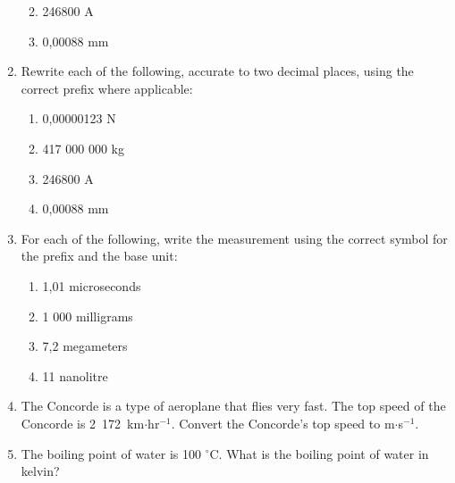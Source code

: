 \begin{enumerate}[noitemsep, label=\textbf{\arabic*}. ]
\begin{enumerate}[noitemsep, label=\textbf{\alph*}. ]
\label{m30853*uid81}\item 246800 A
\label{m30853*uid82}\item 0,00088 mm
\end{enumerate}
                \label{m30853*uid83}\item Rewrite each of the following, accurate to two decimal places, using the correct prefix where applicable:
\label{m30853*id68367}\begin{enumerate}[noitemsep, label=\textbf{\alph*}. ] 
            \label{m30853*uid84}\item 0,00000123 N
\label{m30853*uid85}\item 417 000 000 kg
\label{m30853*uid86}\item 246800 A
\label{m30853*uid87}\item 0,00088 mm
\end{enumerate}
                \label{m30853*uid88}\item For each of the following, write the measurement using the correct symbol for the prefix and the base unit:
\label{m30853*id68433}\begin{enumerate}[noitemsep, label=\textbf{\alph*}. ] 
            \label{m30853*uid89}\item 1,01 microseconds
\label{m30853*uid90}\item 1 000 milligrams
\label{m30853*uid91}\item 7,2 megameters
\label{m30853*uid92}\item 11 nanolitre
\end{enumerate}
                \label{m30853*uid93}\item The Concorde is a type of aeroplane that flies very fast. The top speed of the Concorde is 2~172~km\begin{math}\ensuremath{\cdot}\end{math}hr\begin{math}{}^{-1}\end{math}. Convert the Concorde's top speed to m\begin{math}\ensuremath{\cdot}\end{math}s\begin{math}{}^{-1}\end{math}.        
\label{m30853*uid94}\item The boiling point of water is 100 \begin{math}{}^{\circ }\end{math}C. What is the boiling point of water in kelvin?        
\end{enumerate}
        

